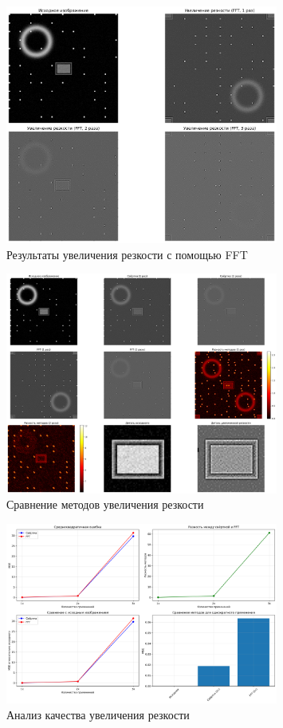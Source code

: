 \begin{figure}[H]
    \centering
    \includegraphics[width=0.8\textwidth]{images/task3/fft_results.png}
    \caption{Результаты увеличения резкости с помощью FFT}
    \label{fig:fft_sharp}
\end{figure}

\begin{figure}[H]
    \centering
    \includegraphics[width=0.8\textwidth]{images/task3/method_comparison.png}
    \caption{Сравнение методов увеличения резкости}
    \label{fig:method_comparison_sharp}
\end{figure}

\begin{figure}[H]
    \centering
    \includegraphics[width=0.8\textwidth]{images/task3/quality_analysis.png}
    \caption{Анализ качества увеличения резкости}
    \label{fig:quality_analysis_sharp}
\end{figure}

